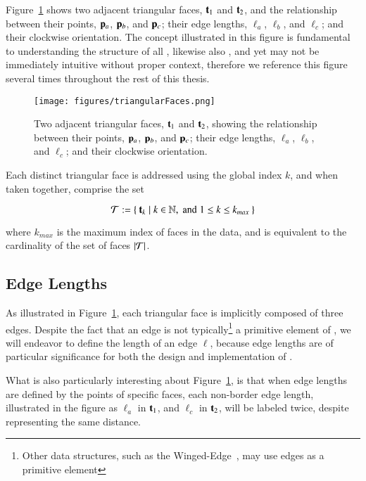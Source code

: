 Figure~\ref{fig:triangularFaces} shows two adjacent triangular faces, $\mathbf{t}_1$ and $\mathbf{t}_2$, and the relationship between their points, $\mathbf{p}_a$, $\mathbf{p}_b$, and $\mathbf{p}_c$; their edge lengths, $\ell_a$, $\ell_b$, and $\ell_c$; and their clockwise orientation. The concept illustrated in this figure is fundamental to understanding the structure of all \tdd{}, likewise also , and yet may not be immediately intuitive without proper context, therefore we reference this figure several times throughout the rest of this thesis.

\begin{figure}[ht]
\ffigbox
	{\texttt{[image: figures/triangularFaces.png]}}
	{\caption[Two Adjacent Triangular Faces]{Two adjacent triangular faces, $\mathbf{t}_1$ and $\mathbf{t}_2$, showing the relationship between their points, $\mathbf{p}_a$, $\mathbf{p}_b$, and $\mathbf{p}_c$; their edge lengths, $\ell_a$, $\ell_b$, and $\ell_c$; and their clockwise orientation.}\label{fig:triangularFaces}}
\end{figure}

Each distinct triangular face is addressed using the global index $k$, and when taken together, comprise the set

\begin{equation}
	\mathcal{T} := \left \{\:\mathbf{t}_k \mid k \in \mathbb{N}, \;\text{and}\; 1\leq k \leq k_{max}\:\right \}
	\label{eq:defineSetOfFaces}
\end{equation}

where $k_{max}$ is the maximum index of faces in the data, and is equivalent to the cardinality of the set of faces $|\mathcal{T}|$.%
%
%

%
%
%
%
\subsection{Edge Lengths}
\label{ch2sTDDssEL}
As illustrated in Figure~\ref{fig:triangularFaces}, each triangular face is implicitly composed of three edges. Despite the fact that an edge is not typically\footnote{Other data structures, such as the Winged-Edge~\cite[p.~1]{Baumgart75}, may use edges as a primitive element} a primitive element of \tdd{}, we will endeavor to define the length of an edge $\ell$, because edge lengths are of particular significance for both the design and implementation of .

What is also particularly interesting about Figure~\ref{fig:triangularFaces}, is that when edge lengths are defined by the points of specific faces, each non-border edge length, illustrated in the figure as $\ell_a$ in $\mathbf{t}_1$, and $\ell_c$ in $\mathbf{t}_2$, will be labeled twice, despite representing the same distance.

